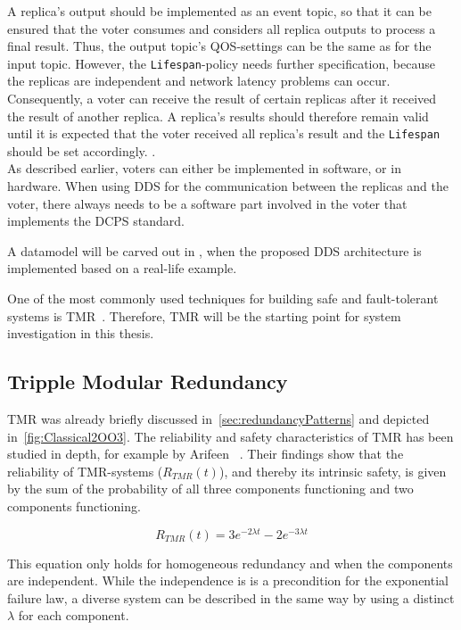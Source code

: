 A replica's output should be implemented as an event topic, so that it can be ensured that the voter consumes and considers all replica outputs to process a final result.
Thus, the output topic's \gls*{QOS}-settings can be the same as for the input topic.
However, the \texttt{Lifespan}-policy needs further specification, because the replicas are independent and network latency problems can occur.
Consequently, a voter can receive the result of certain replicas after it received the result of another replica.
A replica's results should therefore remain valid until it is expected that the voter received all replica's result and the \texttt{Lifespan} should be set accordingly.
.
\\

As described earlier, voters can either be implemented in software, or in hardware.
When using \gls*{DDS} for the communication between the replicas and the voter, there always needs to be a software part involved in the voter that implements the \gls*{DCPS} standard.

A datamodel will be carved out in , when the proposed \gls*{DDS} architecture is implemented based on a real-life example.

One of the most commonly used techniques for building safe and fault-tolerant systems is \gls*{TMR}~\cite{FaultToleranceViaNMR}.
Therefore, \gls*{TMR} will be the starting point for system investigation in this thesis.

\subsection{Tripple Modular Redundancy}
\Gls*{TMR} was already briefly discussed in~\autoref{sec:redundancyPatterns} and depicted in~\autoref{fig:Classical2OO3}.
The reliability and safety characteristics of \gls*{TMR} has been studied in depth, for example by Arifeen \etal~\cite{ArifeenFaultTolerantTMR}.
Their findings show that the reliability of \gls*{TMR}-systems ($R_{TMR}(t)$), and thereby its intrinsic safety, is given by the sum of the probability of all three components functioning and two components functioning.

\begin{equation}
R_{TMR}(t) = 3e^{-2 \lambda t} - 2e^{-3 \lambda t}
\end{equation}

This equation only holds for homogeneous redundancy and when the components are independent.
While the independence is is a precondition for the exponential failure law, a diverse system can be described in the same way by using a distinct $\lambda$ for each component.
\\

